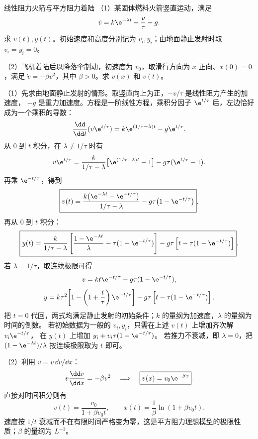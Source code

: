 \begin{practicebox}{线性阻力火箭与平方阻力着陆}
（1）某固体燃料火箭竖直运动，满足
\[
  \dot v=k\e^{-\lambda t}-\frac{v}{\tau}-g.
\]
求 $v(t),y(t)$。初始速度和高度分别记为 $v_i,y_i$；由地面静止发射时取 $v_i=y_i=0$。

（2）飞机着陆后以降落伞制动，初速度为 $v_0$，取滑行方向为 $x$ 正向、$x(0)=0$，满足 $\dot v=-\beta v^2$，其中 $\beta>0$。求 $v(x)$ 和 $v(t)$。
\label{r2ch01:pr:003}
\begin{solution}
（1）先求由地面静止发射的情形。取竖直向上为正，$-v/\tau$ 是线性阻力产生的加速度，
$-g$ 是重力加速度。方程是一阶线性方程，乘积分因子 $\e^{t/\tau}$ 后，左边恰好成为一个乘积的导数：
\[
 \frac{\dd}{\dd t}(v\e^{t/\tau})
 =k\e^{(1/\tau-\lambda)t}-g\e^{t/\tau}.
\]
从 $0$ 到 $t$ 积分，在 $\lambda\ne1/\tau$ 时有
\[
 v\e^{t/\tau}
 =\frac{k}{1/\tau-\lambda}\bigl[\e^{(1/\tau-\lambda)t}-1\bigr]
 -g\tau(\e^{t/\tau}-1).
\]
再乘 $\e^{-t/\tau}$，得到
\[
  \boxed{v(t)=\frac{k\bigl(\e^{-\lambda t}-\e^{-t/\tau}\bigr)}{1/\tau-\lambda}
  -g\tau\bigl(1-\e^{-t/\tau}\bigr)}.
\]
再从 $0$ 到 $t$ 积分：
\[
  \boxed{y(t)=\frac{k}{1/\tau-\lambda}
  \left[\frac{1-\e^{-\lambda t}}{\lambda}-\tau(1-\e^{-t/\tau})\right]
  -g\tau\left[t-\tau(1-\e^{-t/\tau})\right]}.
\]
若 $\lambda=1/\tau$，取连续极限可得
\[
  v=kt\e^{-t/\tau}-g\tau(1-\e^{-t/\tau}),
\]
\[
  y=k\tau^2\!\left[1-\left(1+\frac t\tau\right)\e^{-t/\tau}\right]
  -g\tau\left[t-\tau(1-\e^{-t/\tau})\right].
\]
把 $t=0$ 代回，两式均满足静止发射的初始条件；$k$ 的量纲为加速度，$\lambda$ 的量纲为时间的倒数。
若初始数据为一般的 $v_i,y_i$，只需在上述 $v(t)$ 上增加齐次解 $v_i\e^{-t/\tau}$，
在 $y(t)$ 上增加 $y_i+v_i\tau(1-\e^{-t/\tau})$。
若推力不衰减，即 $\lambda=0$，把 $(1-\e^{-\lambda t})/\lambda$ 按连续极限取为 $t$ 即可。

（2）利用 $\dot v=v\,\dd v/\dd x$：
\[
  v\frac{\dd v}{\dd x}=-\beta v^2
  \quad\Longrightarrow\quad
  \boxed{v(x)=v_0\e^{-\beta x}}.
\]
直接对时间积分则有
\[
  \boxed{v(t)=\frac{v_0}{1+\beta v_0t}},\qquad
  x(t)=\frac1\beta\ln(1+\beta v_0t).
\]
速度按 $1/t$ 衰减而不在有限时间严格变为零，这是平方阻力理想模型的极限性质；$\beta$ 的量纲为 $L^{-1}$。
\end{solution}
\end{practicebox}

